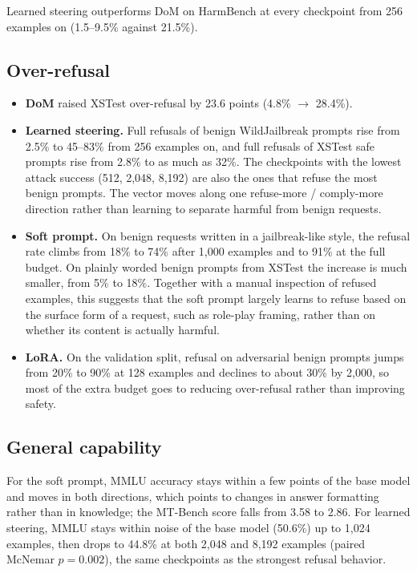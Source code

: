 \documentclass{article}
\begin{document}
Learned steering outperforms DoM on HarmBench at every checkpoint from 256 examples on (1.5--9.5\% against 21.5\%).

\subsection{Over-refusal}\label{sec:5.2}

\begin{itemize}
\item \textbf{DoM} raised XSTest over-refusal by 23.6 points (4.8\% \(\to\) 28.4\%).
\item \textbf{Learned steering.} Full refusals of benign WildJailbreak prompts rise from 2.5\% to 45--83\% from 256 examples on, and full refusals of XSTest safe prompts rise from 2.8\% to as much as 32\%. The checkpoints with the lowest attack success (512, 2,048, 8,192) are also the ones that refuse the most benign prompts. The vector moves along one refuse-more / comply-more direction rather than learning to separate harmful from benign requests.
\item \textbf{Soft prompt.} On benign requests written in a jailbreak-like style, the refusal rate climbs from 18\% to 74\% after 1,000 examples and to 91\% at the full budget. On plainly worded benign prompts from XSTest the increase is much smaller, from 5\% to 18\%. Together with a manual inspection of refused examples, this suggests that the soft prompt largely learns to refuse based on the surface form of a request, such as role-play framing, rather than on whether its content is actually harmful.
\item \textbf{LoRA.} On the validation split, refusal on adversarial benign prompts jumps from 20\% to 90\% at 128 examples and declines to about 30\% by 2,000, so most of the extra budget goes to reducing over-refusal rather than improving safety.
\end{itemize}

\subsection{General capability}\label{sec:5.3}

For the soft prompt, MMLU accuracy stays within a few points of the base model and moves in both directions, which points to changes in answer formatting rather than in knowledge; the MT-Bench score falls from 3.58 to 2.86. For learned steering, MMLU stays within noise of the base model (50.6\%) up to 1,024 examples, then drops to 44.8\% at both 2,048 and 8,192 examples (paired McNemar $p = 0.002$), the same checkpoints as the strongest refusal behavior.
\end{document}
